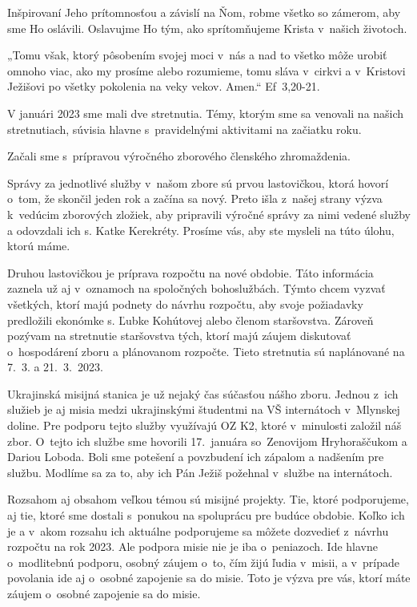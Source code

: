 Inšpirovaní Jeho prítomnosťou a závislí na Ňom, robme  všetko so zámerom, aby sme Ho oslávili. Oslavujme Ho tým, ako sprítomňujeme Krista v~našich životoch.

„Tomu však, ktorý pôsobením svojej moci v~nás a nad to všetko môže urobiť omnoho viac, ako my prosíme alebo rozumieme, tomu sláva v~cirkvi a v~Kristovi Ježišovi po všetky pokolenia na veky vekov. Amen.“ Ef~3,20-21.



V januári 2023 sme mali dve stretnutia. Témy, ktorým sme sa venovali na našich stretnutiach, súvisia hlavne s~pravidelnými aktivitami na začiatku roku.

Začali sme s~prípravou výročného zborového členského zhromaždenia.

Správy za jednotlivé služby v~našom zbore sú prvou lastovičkou, ktorá hovorí o~tom, že skončil jeden rok a začína sa nový. Preto išla z~našej strany výzva k~vedúcim zborových zložiek, aby pripravili výročné správy za nimi vedené služby a odovzdali ich s. Katke Kerekréty. Prosíme vás, aby ste mysleli na túto úlohu, ktorú máme.

Druhou lastovičkou je príprava rozpočtu na nové obdobie. Táto informácia zaznela už aj v~oznamoch na spoločných bohoslužbách. Týmto chcem vyzvať všetkých, ktorí majú podnety do návrhu rozpočtu, aby svoje požiadavky predložili ekonómke s. Ľubke Kohútovej alebo členom staršovstva. Zároveň pozývam na stretnutie staršovstva tých, ktorí majú záujem diskutovať o~hospodárení zboru a plánovanom rozpočte. Tieto stretnutia sú naplánované na 7.~3. a 21.~3.~2023.

Ukrajinská misijná stanica je už nejaký čas súčasťou nášho zboru. Jednou z~ich služieb je aj misia medzi ukrajinskými študentmi na VŠ internátoch v~Mlynskej doline. Pre podporu tejto služby využívajú OZ K2, ktoré v~minulosti  založil náš zbor. O~tejto ich službe sme hovorili 17.~januára so~Zenovijom Hryhoraščukom a Dariou Loboda. Boli sme potešení a povzbudení ich zápalom a nadšením pre službu. Modlíme sa za to, aby ich Pán Ježiš požehnal v~službe na internátoch.

Rozsahom aj obsahom veľkou témou sú misijné projekty. Tie, ktoré podporujeme, aj tie, ktoré sme dostali s~ponukou na spoluprácu pre budúce obdobie. Koľko ich je a v~akom rozsahu ich aktuálne podporujeme sa môžete dozvedieť z~návrhu rozpočtu na rok 2023. Ale podpora misie nie je iba o~peniazoch. Ide hlavne o~modlitebnú podporu, osobný záujem o~to, čím žijú ľudia v~misii, a v~prípade povolania ide aj o~osobné zapojenie sa do misie. Toto je výzva pre vás, ktorí máte záujem o~osobné zapojenie sa do misie.

